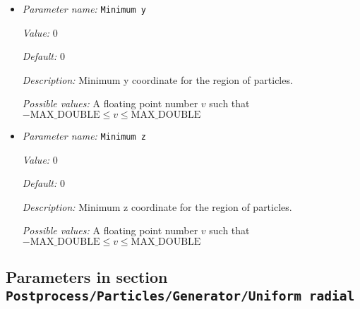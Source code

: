 \begin{itemize}
{\it Value:} 0


{\it Default:} 0


{\it Description:} Minimum x coordinate for the region of particles.


{\it Possible values:} A floating point number $v$ such that $-\text{MAX\_DOUBLE} \leq v \leq \text{MAX\_DOUBLE}$
\item {\it Parameter name:} {\tt Minimum y}
\label{parameters:Postprocess/Particles/Generator/Uniform box/Minimum y}
\label{parameters:Postprocess/Particles/Generator/Uniform_20box/Minimum_20y}


{\it Value:} 0


{\it Default:} 0


{\it Description:} Minimum y coordinate for the region of particles.


{\it Possible values:} A floating point number $v$ such that $-\text{MAX\_DOUBLE} \leq v \leq \text{MAX\_DOUBLE}$
\item {\it Parameter name:} {\tt Minimum z}
\label{parameters:Postprocess/Particles/Generator/Uniform box/Minimum z}
\label{parameters:Postprocess/Particles/Generator/Uniform_20box/Minimum_20z}


{\it Value:} 0


{\it Default:} 0


{\it Description:} Minimum z coordinate for the region of particles.


{\it Possible values:} A floating point number $v$ such that $-\text{MAX\_DOUBLE} \leq v \leq \text{MAX\_DOUBLE}$
\end{itemize}

\subsection{Parameters in section \tt Postprocess/Particles/Generator/Uniform radial}
\label{parameters:Postprocess/Particles/Generator/Uniform_20radial}

